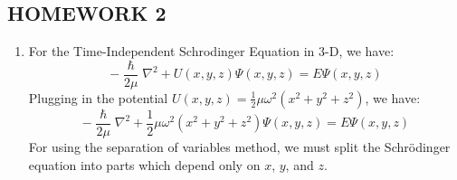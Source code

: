 \documentclass[10pt]{article}
\begin{document}

\begin{centering}
  \section*{HOMEWORK 2}
\end{centering}

\begin{enumerate}
  \item For the Time-Independent Schrodinger Equation in 3-D, we have:
    \begin{equation*}
      - \frac{\hslash}{2 \mu} \nabla ^2 + U \left( x,y,z \right) \Psi \left( x,y,z \right) = E \Psi \left( x,y,z \right)
    \end{equation*}
    Plugging in the potential $ U \left( x,y,z \right) = \frac{1}{2} \mu \omega ^2 \left( x^2+y^2+z^2 \right) $, we have:
    \begin{equation*}
      - \frac{\hslash}{2 \mu} \nabla ^2 + \frac{1}{2} \mu \omega ^2 \left( x^2+y^2+z^2 \right)  \Psi \left( x,y,z \right) = E \Psi \left( x,y,z \right)
    \end{equation*}
    For using the separation of variables method, we must split the Schr{\"o}dinger equation into parts which depend only on $ x $, $ y $, and $ z $.


\end{enumerate}
\end{document}
